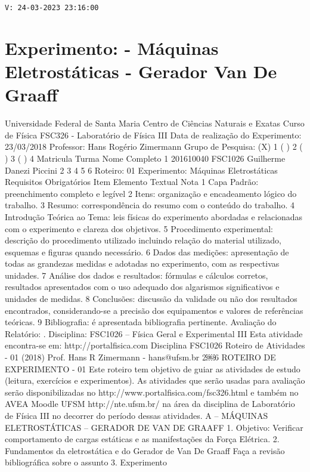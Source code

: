 \noindent \texttt{V: 24-03-2023 23:16:00}

\section*{Experimento: - Máquinas Eletrostáticas - Gerador Van De Graaff}

Universidade Federal de Santa Maria
Centro de Ciências Naturais e Exatas
Curso de Física 
FSC326 - Laboratório de Física III
Data de realização do Experimento: 23/03/2018
Professor: Hans Rogério Zimermann
Grupo de Pesquisa: (X) 1 ( ) 2 ( ) 3 ( ) 4
Matricula Turma Nome Completo
1 201610040 FSC1026 Guilherme Danezi Piccini
2
3
4
5
6
Roteiro: 01
Experimento: Máquinas Eletrostáticas
Requisitos Obrigatórios
Item Elemento Textual Nota
1 Capa Padrão: preenchimento completo e legível
2 Itens: organização e encadeamento lógico do trabalho.
3 Resumo: correspondência do resumo com o conteúdo do trabalho.
4 Introdução Teórica ao Tema: leis físicas do experimento abordadas e relacionadas com o 
experimento e clareza dos objetivos.
5 Procedimento experimental: descrição do procedimento utilizado incluindo relação do material 
utilizado, esquemas e figuras quando necessário.
6 Dados das medições: apresentação de todas as grandezas medidas e adotadas no 
experimento, com as respectivas unidades.
7 Análise dos dados e resultados: fórmulas e cálculos corretos, resultados apresentados com o 
uso adequado dos algarismos significativos e unidades de medidas.
8 Conclusões: discussão da validade ou não dos resultados encontrados, considerando-se a 
precisão dos equipamentos e valores de referências teóricas.
9 Bibliografia: é apresentada bibliografia pertinente.
Avaliação do Relatório: . 
Disciplina: FSC1026 – Física Geral e Experimental III
Esta atividade encontra-se em: http://portalfisica.com Disciplina FSC1026
Roteiro de Atividades - 01 (2018) 
Prof. Hans R Zimermann - hans@ufsm.br
2￼6
ROTEIRO DE EXPERIMENTO - 01
Este roteiro tem objetivo de guiar as atividades de estudo (leitura, exercícios e experimentos). As atividades que serão usadas para avaliação 
serão disponibilizadas no http://www.portalfisica.com/fsc326.html e também no AVEA Moodle UFSM http://nte.ufsm.br/ na área da disciplina de 
Laboratório de Física III no decorrer do período dessas atividades.
A – MÁQUINAS ELETROSTÁTICAS – GERADOR DE VAN DE GRAAFF
1. Objetivo:
Verificar comportamento de cargas estáticas e as manifestações da Força Elétrica.
2. Fundamentos da eletrostática e do Gerador de Van De Graaff
Faça a revisão bibliográfica sobre o assunto
3. Experimento
